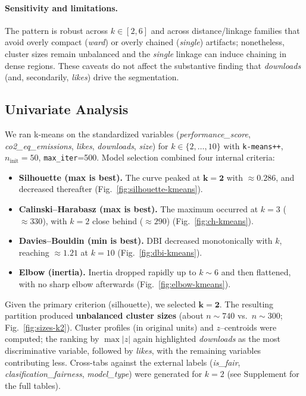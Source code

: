 \documentclass[journal]{IEEEtran}
\begin{document}
\paragraph{Sensitivity and limitations.}
The pattern is robust across $k\in[2,6]$ and across distance/linkage families that avoid overly compact
(\emph{ward}) or overly chained (\emph{single}) artifacts; nonetheless, cluster sizes remain unbalanced and
the \emph{single} linkage can induce chaining in dense regions. These caveats do not affect the substantive
finding that \emph{downloads} (and, secondarily, \emph{likes}) drive the segmentation.

 \subsection{Univariate Analysis}
We ran k-means on the standardized variables
(\textit{performance\_score}, \textit{co2\_eq\_emissions}, \textit{likes}, \textit{downloads}, \textit{size})
for $k\in\{2,\ldots,10\}$ with \texttt{k-means++}, $n_{\text{init}}{=}50$, \texttt{max\_iter}{=}500.
Model selection combined four internal criteria:

\begin{itemize}
	\item \textbf{Silhouette (max is best).} The curve peaked at $\mathbf{k=2}$ with $\approx\mathbf{0.286}$, and decreased thereafter (Fig.~\ref{fig:silhouette-kmeans}).
	\item \textbf{Calinski--Harabasz (max is best).} The maximum occurred at $k{=}3$ ($\approx\!330$), with $k{=}2$ close behind ($\approx\!290$) (Fig.~\ref{fig:ch-kmeans}).
	\item \textbf{Davies--Bouldin (min is best).} DBI decreased monotonically with $k$, reaching $\approx\!1.21$ at $k{=}10$ (Fig.~\ref{fig:dbi-kmeans}).
	\item \textbf{Elbow (inertia).} Inertia dropped rapidly up to $k{\sim}6$ and then flattened, with no sharp elbow afterwards (Fig.~\ref{fig:elbow-kmeans}).
\end{itemize}

Given the primary criterion (silhouette), we selected $\mathbf{k=2}$.
The resulting partition produced \textbf{unbalanced cluster sizes} (about $n{\sim}740$ vs.\ $n{\sim}300$; Fig.~\ref{fig:sizes-k2}).
Cluster profiles (in original units) and $z$–centroids were computed; the ranking by $\max|z|$ again highlighted
\textit{downloads} as the most discriminative variable, followed by \textit{likes}, with the remaining variables contributing less.
Cross-tabs against the external labels (\textit{is\_fair}, \textit{clasification\_fairness}, \textit{model\_type}) were generated for $k{=}2$
(see Supplement for the full tables).
\end{document}

